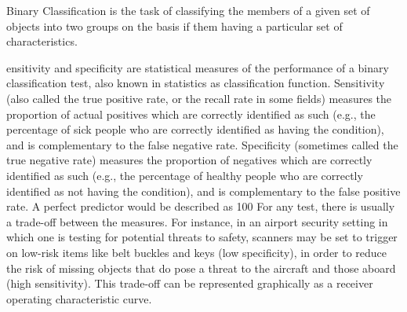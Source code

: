 Binary Classification is the task of classifying the members of a given set of objects into two groups on the basis
if them having a particular set of characteristics.

ensitivity and specificity are statistical measures of the performance of a binary classification test, also known in statistics as classification function. Sensitivity (also called the true positive rate, or the recall rate in some fields) measures the proportion of actual positives which are correctly identified as such (e.g., the percentage of sick people who are correctly identified as having the condition), and is complementary to the false negative rate. Specificity (sometimes called the true negative rate) measures the proportion of negatives which are correctly identified as such (e.g., the percentage of healthy people who are correctly identified as not having the condition), and is complementary to the false positive rate.
A perfect predictor would be described as 100%
For any test, there is usually a trade-off between the measures. For instance, in an airport security setting in which one is testing for potential threats to safety, scanners may be set to trigger on low-risk items like belt buckles and keys (low specificity), in order to reduce the risk of missing objects that do pose a threat to the aircraft and those aboard (high sensitivity). This trade-off can be represented graphically as a receiver operating characteristic curve.
